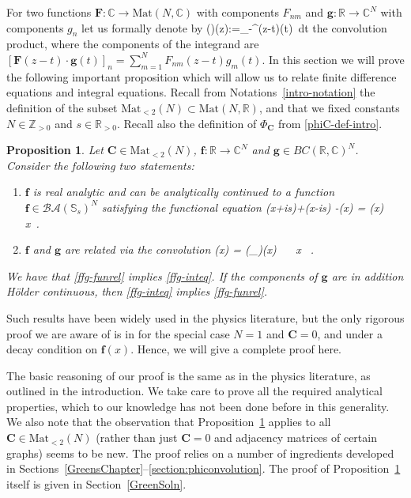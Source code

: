 \documentclass[12pt]{article}
\theoremstyle{plain}
\newtheorem{proposition}[theorem]{Proposition}
\theoremstyle{definition}
\numberwithin{equation}{section}
\numberwithin{theorem}{section}
\def\be#1\ee{\begin{equation}#1\end{equation}}
\renewcommand{\vec}[1]{\mathbf{#1}}
\begin{document}
For two functions $\vec{F} : \mathbb{C} \to \mathrm{Mat}(N,\mathbb{C})$ with components $F_{nm}$ and  $\vec{g}:\mathbb{R}\rightarrow\mathbb{C}^N$ with components $g_n$ let us formally denote by
\be\left(\vec{F}\star \vec{g}\right)(z):=\int_{-\infty}^\infty \vec{F}(z-t)\cdot \vec{g}(t)\ dt
\ee
the convolution product, where the components of the integrand are
$[\vec{F}(z-t)\cdot \vec{g}(t)]_n = \sum_{m=1}^N F_{nm}(z-t) g_m(t)$.
In this section we will prove the following important proposition which will allow us to relate finite difference equations and integral equations.  Recall from Notations~\ref{intro-notation} the definition of the subset
$\mathrm{Mat}_{<2}(N) \subset \mathrm{Mat}(N,\mathbb{R})$, and that we fixed constants $N \in \mathbb{Z}_{>0}$ and $s \in \mathbb{R}_{>0}$. Recall also the definition of $\Phi_{\vec C}$ from \eqref{phiC-def-intro}.


\begin{proposition}\label{FuncRelToNLIE}
Let $\vec{C}\in\mathrm{Mat}_{<2}(N)$,
 $\vec{f} :\mathbb{R}\rightarrow\mathbb{C}^N$ and $\vec{g} \in BC(\mathbb{R},\mathbb{C})^N$.
Consider the following two statements:
\begin{enumerate}
\item \label{ffg-funrel} $\vec{f}$ is real analytic and can be analytically continued to a function $\vec{f}\in \mathcal{BA}(\mathbb{S}_s)^N$ satisfying the functional equation
\be\label{ffuncrel}
\vec{f}(x+is)+\vec{f}(x-is) -\vec{C}\cdot\vec{f}(x) = \vec{g}(x) 
\qquad {}~~ x\in{}\ .
\ee
\item \label{ffg-inteq} $\vec{f}$ and $\vec{g}$ are related via the convolution
\be\label{fconv}
\vec{f}(x) = \left(\Phi_{\vec C}\star \vec{g}\right)(x)\hspace{1cm} \qquad {}~~ x\in{} \ .
\ee
\end{enumerate}
We have that \ref{ffg-funrel} implies \ref{ffg-inteq}. If the components of $\vec g$ are in addition H\"older continuous, then \ref{ffg-inteq} implies \ref{ffg-funrel}.
\end{proposition}


Such results have been widely used in the physics literature, but the only rigorous proof we are aware of is in \cite[Lem.\,2]{TraceyWidom} for the special case $N=1$ and
 $\vec{C}=0$, and under
	a decay condition on $\vec{f}(x)$.
  Hence, we will give a complete proof here.

 
The basic reasoning of our proof is the same as in the physics literature, as outlined in the introduction. We take care to prove all the required analytical properties, which to our knowledge has not been done before in this generality. We also note that the observation that Proposition~\ref{FuncRelToNLIE} applies to all $\vec{C} \in \mathrm{Mat}_{<2}(N)$
(rather than just $\vec{C}=0$ and
adjacency matrices of certain graphs) seems to be new.
The proof relies on a number of ingredients developed in Sections~\ref{GreensChapter}--\ref{section:phiconvolution}. The proof 
of Proposition~\ref{FuncRelToNLIE} itself is given in Section~\ref{GreenSoln}.
\end{document}
